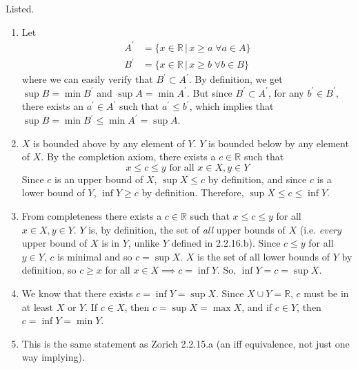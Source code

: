   \begin{solution}
    Listed. 
    \begin{enumerate}
      \item Let 
      \begin{align*}
        A^\prime & = \{ x \in \mathbb{R} \,|\, x \geq a \; \forall a \in A\} \\
        B^\prime & = \{ x \in \mathbb{R} \,|\, x \geq b \; \forall b \in B\}
      \end{align*}
      where we can easily verify that $B^\prime \subset A^\prime$. By definition, we get $\sup{B} = \min{B^\prime}$ and $\sup{A} = \min{A^\prime}$. But since $B^\prime \subset A^\prime$, for any $b^\prime \in B^\prime$, there exists an $a^\prime \in A^\prime$ such that $a^\prime \leq b^\prime$, which implies that $\sup{B} = \min{B^\prime} \leq \min{A^\prime} = \sup{A}$. 

      \item $X$ is bounded above by any element of $Y$. $Y$ is bounded below by any element of $X$. By the completion axiom, there exists a $c \in \mathbb{R}$ such that
      \begin{equation}
        x \leq c \leq y \text{ for all } x \in X, y \in Y
      \end{equation}
      Since $c$ is an upper bound of $X$, $\sup{X} \leq c$ by definition, and since $c$ is a lower bound of $Y$, $\inf{Y} \geq c$ by definition. Therefore, $\sup{X} \leq c \leq \inf{Y}$. 

      \item From completeness there exists a $c \in \mathbb{R}$ such that $x \leq c \leq y$ for all $x \in X, y \in Y$. $Y$ is, by definition, the set of \textit{all} upper bounds of $X$ (i.e. \textit{every} upper bound of $X$ is in $Y$, unlike $Y$ defined in 2.2.16.b). Since $c \leq y$ for all $y \in Y$, $c$ is minimal and so $c = \sup{X}$. $X$ is the set of all lower bounds of $Y$ by definition, so $c \geq x$ for all $x \in X \implies c = \inf{Y}$. So, $\inf{Y} = c = \sup{X}$. 

      \item We know that there exists $c = \inf{Y} = \sup{X}$. Since $X \cup Y = \mathbb{R}$, $c$ must be in at least $X$ or $Y$. If $c \in X$, then $c = \sup{X} = \max{X}$, and if $c \in Y$, then $c = \inf{Y} = \min{Y}$. 
      \item This is the same statement as Zorich 2.2.15.a (an iff equivalence, not just one way implying). 
    \end{enumerate}
  \end{solution}

